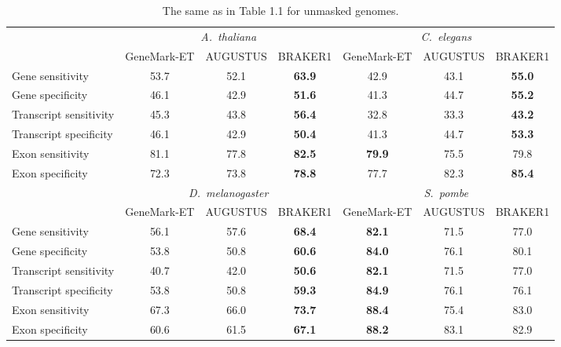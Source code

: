 \documentclass[a4paper,10pt]{report}
\begin{document}
\begin{table}
\begin{center}
 \begin{scriptsize}
 \begin{tabular}{|l|ccc|ccc|}
 \hline
& \multicolumn{3}{|c|}{\textit{A.~thaliana}} & \multicolumn{3}{|c|}{\textit{C.~elegans}}\\
& GeneMark-ET & AUGUSTUS & BRAKER1 & GeneMark-ET & AUGUSTUS & BRAKER1\\
\hline
Gene sensitivity        & 53.7 & 52.1 & \textbf{63.9} & 42.9 & 43.1 & \textbf{55.0}\\
Gene specificity        & 46.1 & 42.9 & \textbf{51.6} & 41.3 & 44.7 & \textbf{55.2}\\
Transcript sensitivity  & 45.3 & 43.8 & \textbf{56.4} & 32.8 & 33.3 & \textbf{43.2}\\
Transcript specificity  & 46.1 & 42.9 & \textbf{50.4} & 41.3 & 44.7 & \textbf{53.3}\\
Exon sensitivity        & 81.1 & 77.8 & \textbf{82.5} & \textbf{79.9} & 75.5 & 79.8\\
Exon specificity        & 72.3 & 73.8 & \textbf{78.8} & 77.7 & 82.3 & \textbf{85.4}\\
\hline
& \multicolumn{3}{|c|}{\textit{D.~melanogaster}} & \multicolumn{3}{|c|}{\textit{S.~pombe}}\\
& GeneMark-ET & AUGUSTUS & BRAKER1 & GeneMark-ET & AUGUSTUS & BRAKER1\\
\hline
Gene sensitivity       & 56.1 & 57.6 & \textbf{68.4} & \textbf{82.1} & 71.5 & 77.0\\
Gene specificity       & 53.8 & 50.8 & \textbf{60.6} & \textbf{84.0} & 76.1 & 80.1\\
Transcript sensitivity & 40.7 & 42.0 & \textbf{50.6} & \textbf{82.1} & 71.5 & 77.0\\
Transcript specificity & 53.8 & 50.8 & \textbf{59.3} & \textbf{84.9} & 76.1 & 76.1\\
Exon sensitivity       & 67.3 & 66.0 & \textbf{73.7} & \textbf{88.4} & 75.4 & 83.0\\
Exon specificity       & 60.6 & 61.5 & \textbf{67.1} & \textbf{88.2} & 83.1 & 82.9\\
\hline
 \end{tabular}
\end{scriptsize}
\end{center}
\caption{The same as in Table 1.1 for unmasked genomes.\label{unmasked}}
\end{table}
\end{document}
